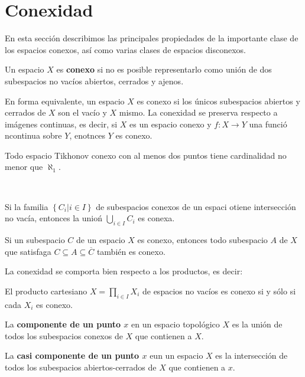 \documentclass[12pt]{report}
\theoremstyle{largebreak}
\newcommand{\cf}[3]{\ensuremath{#1:#2\rightarrow#3}}
\begin{document}
    \section{Conexidad}
    
    En esta sección describimos las principales propiedades de la importante clase de los espacios conexos, así como varias clases de espacios disconexos.

    \begin{mydef}
        Un espacio $X$ es \textbf{conexo} si no es posible representarlo como unión de dos subespacios no vacíos abiertos, cerrados y ajenos.
    \end{mydef}

    En forma equivalente, un espacio $X$ es conexo si los únicos subespacios abiertos y cerrados de $X$ son el vacío y $X$ mismo. La conexidad se preserva respecto a imágenes continuas, es decir, si $X$ es un espacio conexo y $\cf{f}{X}{Y}$ una funció ncontinua sobre $Y$, enotnces $Y$ es conexo.

    \begin{theor}
        Todo espacio Tikhonov conexo con al menos dos puntos tiene cardinalidad no menor que $\aleph_1$.
    \end{theor}\

    \begin{theor}
        Si la familia $\left\{C_i\Big|i\in I \right\}$ de subespacios conexos de un espaci otiene intersección no vacía, entonces la unioń $\bigcup_{i\in I}C_i$ es conexa.

        Si un subespacio $C$ de un espacio $X$ es conexo, entonces todo subespacio $A$ de $X$ que satisfaga $C\subseteq A\subseteq\overline{C}$ también es conexo.
    \end{theor}

    La conexidad se comporta bien respecto a los productos, es decir:

    \begin{theor}
        El producto cartesiano $X=\prod_{i\in I}X_i$ de espacios no vacíos es conexo si y sólo si cada $X_i$ es conexo.
    \end{theor}

    \begin{mydef}
        La \textbf{componente de un punto $x$} en un espacio topológico $X$ es la unión de todos los subespacios conexos de $X$ que contienen a $X$.

        La \textbf{casi componente de un punto $x$} eun un espacio $X$ es la intersección de todos los subespacios abiertos-cerrados de $X$ que contienen a $x$.
    \end{mydef}
\end{document}
